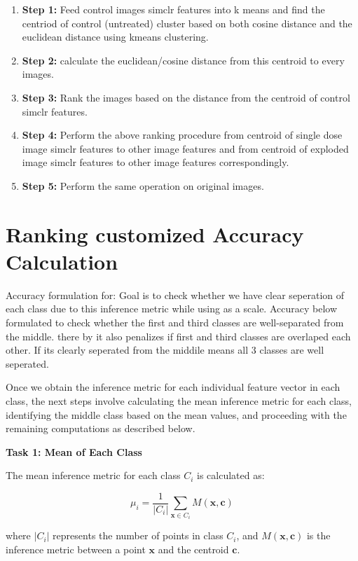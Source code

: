 \begin{enumerate}
  \item \textbf{Step 1:} Feed control images simclr features into k means and find the centriod of control (untreated) cluster based on both cosine distance and the euclidean distance using kmeans clustering. 
 
  
  \item \textbf{Step 2:} calculate the euclidean/cosine distance from this centroid to every images.
  \item \textbf{Step 3:} Rank the images based on the distance from the centroid of control simclr features.
  \item \textbf{Step 4:} Perform the above ranking procedure from centroid of single dose image simclr features to other image features and from centroid of exploded image simclr features to other image features correspondingly.
  
  \item \textbf{Step 5:} Perform the same operation  on original images.
\end{enumerate}


\section*{Ranking customized Accuracy Calculation}

Accuracy formulation for: Goal is to check whether we have clear seperation of each class due to this inference metric while using as a scale. Accuracy below formulated to check whether the first and third classes are well-separated from the middle. there by it also penalizes if first and third classes are overlaped each other. If its clearly seperated from the middile means all 3 classes  are well seperated. 

Once we obtain the inference metric for each individual feature vector in each class, the next steps involve calculating the mean inference metric for each class, identifying the middle class based on the mean values, and proceeding with the remaining computations as described below.

\textbf{Task 1: Mean of Each Class}

The mean inference metric for each class \( C_i \) is calculated as:

\[
\mu_i = \frac{1}{|C_i|} \sum_{\mathbf{x} \in C_i} M(\mathbf{x}, \mathbf{c})
\]

where \( |C_i| \) represents the number of points in class \( C_i \), and \( M(\mathbf{x}, \mathbf{c}) \) is the inference metric between a point \( \mathbf{x} \) and the centroid \( \mathbf{c} \).

